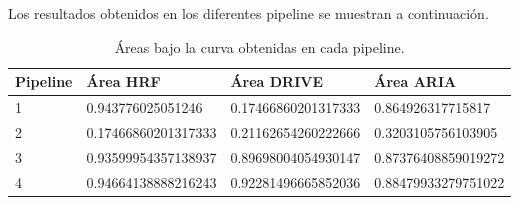 Los resultados obtenidos en los diferentes pipeline se muestran a continuaci\'on.


\begin{table}[H]
\begin{center}
\begin{tabular}{|l|l|l|l|}
\hline
Pipeline & \'Area HRF & \'Area DRIVE & \'Area ARIA \\
\hline \hline
1 & 0.943776025051246 & 0.17466860201317333 & 0.864926317715817 \\ \hline
2 & 0.17466860201317333 & 0.21162654260222666 & 0.3203105756103905 \\ \hline
3 & 0.93599954357138937 & 0.89698004054930147 & 0.87376408859019272 \\ \hline
4 & 0.94664138888216243 & 0.92281496665852036 & 0.88479933279751022 \\ \hline
\end{tabular}
\caption{\'Areas bajo la curva obtenidas en cada pipeline.}
\label{tabla:sencilla}
\end{center}
\end{table}
 

